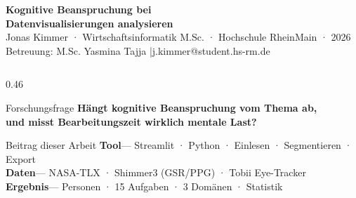 \documentclass[final]{beamer}
\newcommand{\lw}{0.46\textwidth}
\begin{document}
\begin{frame}[t]{}


\vspace{1.0cm}
{\color{white}\fontsize{52}{62}\selectfont\bfseries
  Kognitive Beanspruchung bei\\[0.3cm]
  Datenvisualisierungen analysieren}\\[0.6cm]
{\color{white}\fontsize{24}{30}\selectfont
  Jonas Kimmer · Wirtschaftsinformatik M.Sc. · Hochschule RheinMain · 2026}\\[0.3cm]
{\color{soft}\fontsize{20}{26}\selectfont
  Betreuung: M.Sc. Yasmina Tajja \quad|\quad j.kimmer@student.hs-rm.de}
\vspace{2.0cm}

\begin{columns}[T]

\begin{column}{\lw}

  \begin{alertblock}{Forschungsfrage}
    \vspace{0.3em}
    \LARGE\bfseries
    Hängt kognitive Beanspruchung vom Thema ab,\\
    und misst Bearbeitungszeit wirklich mentale Last?
    \vspace{0.3em}
  \end{alertblock}

  \vspace{0.8em}

  \begin{block}{Beitrag dieser Arbeit}
    \vspace{0.4em}
    {\large
    \textcolor{primary}{\bfseries Tool\enskip}—\enskip
      Streamlit · Python · Einlesen · Segmentieren · Export\\[0.5em]
    \textcolor{primary}{\bfseries Daten\enskip}—\enskip
      NASA-TLX · Shimmer3 (GSR/PPG) · Tobii Eye-Tracker\\[0.5em]
    \textcolor{primary}{\bfseries Ergebnis\enskip}— Personen · 15 Aufgaben · 3 Domänen · Statistik
    }
    \vspace{0.3em}
  \end{block}


\end{column}
\end{columns}
\end{frame}
\end{document}
